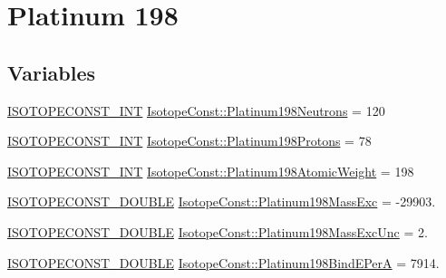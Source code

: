 \hypertarget{group___isotope_const-_platinum-_pt198}{}\section{Platinum 198}
\label{group___isotope_const-_platinum-_pt198}
\subsection*{Variables}
\begin{DoxyCompactItemize}
\item 
\mbox{\hyperlink{group___isotope_const-_macros_ga5f18360b3e99483a35c32d789e62621c}{I\+S\+O\+T\+O\+P\+E\+C\+O\+N\+S\+T\+\_\+\+I\+NT}} \mbox{\hyperlink{group___isotope_const-_platinum-_pt198_gafaaeaddeb21cb4fea56d3618a608c14c}{Isotope\+Const\+::\+Platinum198\+Neutrons}} = 120
\item 
\mbox{\hyperlink{group___isotope_const-_macros_ga5f18360b3e99483a35c32d789e62621c}{I\+S\+O\+T\+O\+P\+E\+C\+O\+N\+S\+T\+\_\+\+I\+NT}} \mbox{\hyperlink{group___isotope_const-_platinum-_pt198_ga36df3ea63001d05d12ef7ef2a4c1ef12}{Isotope\+Const\+::\+Platinum198\+Protons}} = 78
\item 
\mbox{\hyperlink{group___isotope_const-_macros_ga5f18360b3e99483a35c32d789e62621c}{I\+S\+O\+T\+O\+P\+E\+C\+O\+N\+S\+T\+\_\+\+I\+NT}} \mbox{\hyperlink{group___isotope_const-_platinum-_pt198_gafdc54bb5aea61cce78cb17b5af01b000}{Isotope\+Const\+::\+Platinum198\+Atomic\+Weight}} = 198
\item 
\mbox{\hyperlink{group___isotope_const-_macros_ga8f45a7272ce02c0b4c65c44636ed719a}{I\+S\+O\+T\+O\+P\+E\+C\+O\+N\+S\+T\+\_\+\+D\+O\+U\+B\+LE}} \mbox{\hyperlink{group___isotope_const-_platinum-_pt198_ga3367bc17e56ce17484acb983ea617cea}{Isotope\+Const\+::\+Platinum198\+Mass\+Exc}} = -\/29903.
\item 
\mbox{\hyperlink{group___isotope_const-_macros_ga8f45a7272ce02c0b4c65c44636ed719a}{I\+S\+O\+T\+O\+P\+E\+C\+O\+N\+S\+T\+\_\+\+D\+O\+U\+B\+LE}} \mbox{\hyperlink{group___isotope_const-_platinum-_pt198_gad8594f66ea9f3e6902f7b54c03eb37f1}{Isotope\+Const\+::\+Platinum198\+Mass\+Exc\+Unc}} = 2.
\item 
\mbox{\hyperlink{group___isotope_const-_macros_ga8f45a7272ce02c0b4c65c44636ed719a}{I\+S\+O\+T\+O\+P\+E\+C\+O\+N\+S\+T\+\_\+\+D\+O\+U\+B\+LE}} \mbox{\hyperlink{group___isotope_const-_platinum-_pt198_ga04900c2bad53e1246890a1d7d27db4ae}{Isotope\+Const\+::\+Platinum198\+Bind\+E\+PerA}} = 7914.
\item 

\end{DoxyCompactItemize}
